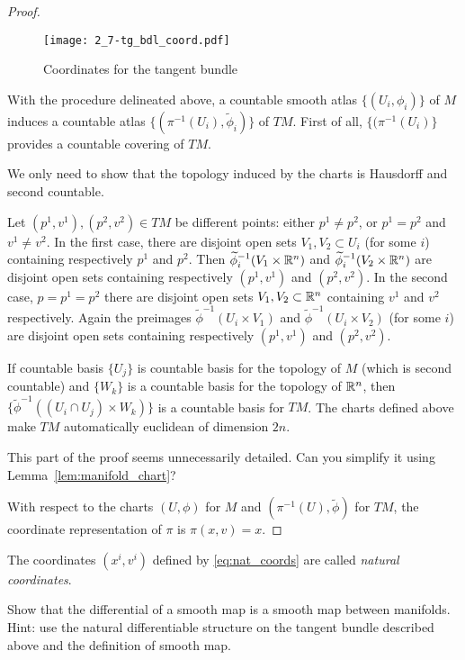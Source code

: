 \begin{proof}
  \begin{figure*}[htp]
    \texttt{[image: 2\_7-tg\_bdl\_coord.pdf]}
    \caption{Coordinates for the tangent bundle}
  \end{figure*}
  
  With the procedure delineated above, a countable smooth atlas $\{(U_i, \phi_i)\}$ of $M$ induces a countable atlas $\{(\pi^{-1}(U_i), \widetilde\phi_i)\}$ of $TM$.
  First of all, $\{(\pi^{-1}(U_i)\}$ provides a countable covering of $TM$.
  
  We only need to show that the topology induced by the charts is Hausdorff and second countable.
  
  Let $(p^1, v^1), (p^2, v^2) \in TM$ be different points: either $p^1\neq p^2$, or $p^1 = p^2$ and $v^1 \neq v^2$.
  In the first case, there are disjoint open sets $V_1, V_2 \subset U_i$ (for some $i$) containing respectively $p^1$ and $p^2$.
  Then $\widetilde\phi_i^{-1}(V_1\times\mathbb{R}^n)$ and $\widetilde\phi_i^{-1}(V_2\times\mathbb{R}^n)$ are disjoint open sets containing respectively $(p^1, v^1)$ and $(p^2, v^2)$.
  In the second case, $p=p^1=p^2$ there are disjoint open sets $V_1,V_2\subset \mathbb{R}^n$ containing $v^1$ and $v^2$ respectively.
  Again the preimages $\widetilde\phi^{-1}(U_i\times V_1)$ and $\widetilde\phi^{-1}(U_i\times V_2)$ (for some $i$) are disjoint open sets containing respectively $(p^1, v^1)$ and $(p^2, v^2)$.

  If countable basis $\{U_j\}$ is countable basis for the topology of $M$ (which is second countable) and $\{W_k\}$ is a countable basis for the topology of $\mathbb{R}^n$, then $\{\widetilde\phi^{-1}((U_i\cap U_j)\times W_k)\}$ is a countable basis for $TM$.
  The charts defined above make $TM$ automatically euclidean of dimension $2n$.

  \begin{exercise}
    This part of the proof seems unnecessarily detailed.
    Can you simplify it using Lemma~\ref{lem:manifold_chart}?
  \end{exercise}

   With respect to the charts $(U,\phi)$ for $M$ and $(\pi^{-1}(U), \widetilde\phi)$ for $TM$, the coordinate representation of $\pi$ is $\pi(x,v) = x$.
\end{proof}

The coordinates $(x^i, v^i)$ defined by \eqref{eq:nat_coords} are called \emph{natural coordinates}.

\begin{exercise}
  Show that the differential of a smooth map is a smooth map between manifolds. Hint: use the natural differentiable structure on the tangent bundle described above and the definition of smooth map.
\end{exercise}

